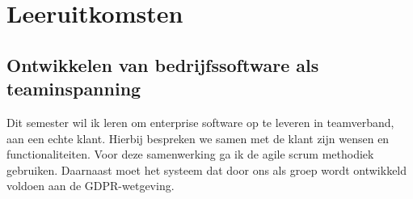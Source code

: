 \chapter{Leeruitkomsten}
\label{ch:learning_outcomes}








\section{Ontwikkelen van bedrijfssoftware als teaminspanning}\label{sec:ontwikkelen-van-bedrijfssoftware-als-teaminspanning}



Dit semester wil ik leren om enterprise software op te leveren in teamverband, aan een echte klant.
Hierbij bespreken we samen met de klant zijn wensen en functionaliteiten.
Voor deze samenwerking ga ik de agile scrum methodiek gebruiken.
Daarnaast moet het systeem dat door ons als groep wordt ontwikkeld voldoen aan de GDPR-wetgeving.


